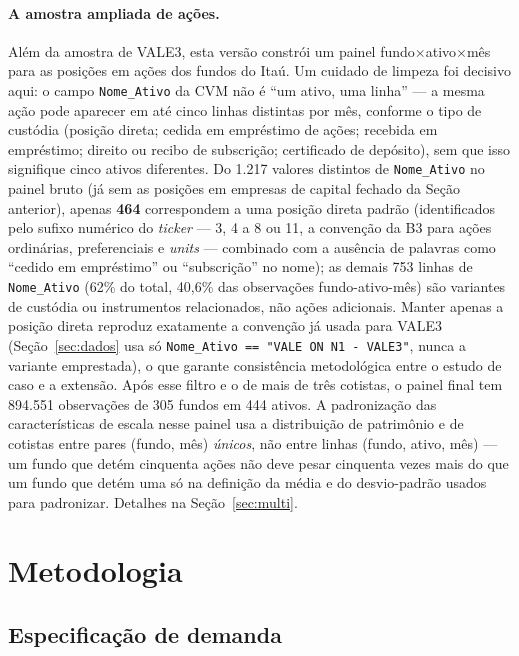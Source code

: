\documentclass[12pt,a4paper]{article}
\begin{document}
\paragraph{A amostra ampliada de ações.} Além da amostra de VALE3, esta versão constrói um
painel fundo$\times$ativo$\times$mês para as posições em ações dos fundos do Itaú. Um cuidado de
limpeza foi decisivo aqui: o campo \texttt{Nome\_Ativo} da CVM não é ``um ativo, uma linha'' --- a
mesma ação pode aparecer em até cinco linhas distintas por mês, conforme o tipo de custódia
(posição direta; cedida em empréstimo de ações; recebida em empréstimo; direito ou recibo de
subscrição; certificado de depósito), sem que isso signifique cinco ativos diferentes. Do
1.217 valores distintos de \texttt{Nome\_Ativo} no painel bruto (já sem as posições em empresas de
capital fechado da Seção anterior), apenas \textbf{464} correspondem a uma posição direta
padrão (identificados pelo sufixo numérico do \emph{ticker} --- 3, 4 a 8 ou 11, a convenção da B3
para ações ordinárias, preferenciais e \emph{units} --- combinado com a ausência de palavras como
``cedido em empréstimo'' ou ``subscrição'' no nome); as demais 753 linhas de \texttt{Nome\_Ativo}
(62\% do total, 40,6\% das observações fundo-ativo-mês) são variantes de custódia ou instrumentos
relacionados, não ações adicionais. Manter apenas a posição direta reproduz exatamente a
convenção já usada para VALE3 (Seção~\ref{sec:dados} usa só \texttt{Nome\_Ativo == "VALE ON N1 -
VALE3"}, nunca a variante emprestada), o que garante consistência metodológica entre o estudo de
caso e a extensão. Após esse filtro e o de mais de três cotistas, o painel final tem 894.551
observações de 305 fundos em 444 ativos. A padronização das características de escala nesse
painel usa a distribuição de patrimônio e de cotistas entre pares (fundo, mês) \emph{únicos}, não
entre linhas (fundo, ativo, mês) --- um fundo que detém cinquenta ações não deve pesar cinquenta
vezes mais do que um fundo que detém uma só na definição da média e do desvio-padrão usados para
padronizar. Detalhes na Seção~\ref{sec:multi}.

\section{Metodologia}

\subsection{Especificação de demanda}
\end{document}
